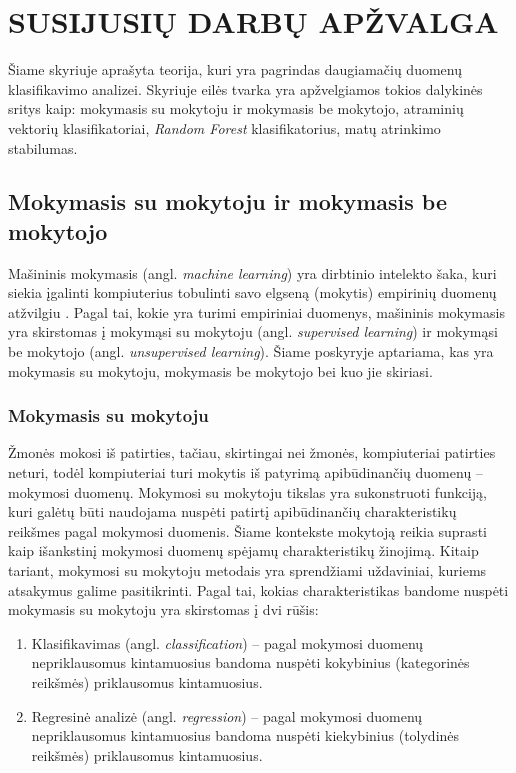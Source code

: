 \section{SUSIJUSIŲ DARBŲ APŽVALGA}
\label{darbu_apzvalga}

Šiame skyriuje aprašyta teorija, kuri yra pagrindas daugiamačių duomenų klasifikavimo analizei. Skyriuje eilės tvarka yra apžvelgiamos tokios dalykinės sritys kaip: mokymasis su mokytoju ir mokymasis be mokytojo, atraminių vektorių klasifikatoriai, \textit{Random Forest} klasifikatorius, matų atrinkimo stabilumas.

\subsection{Mokymasis su mokytoju ir mokymasis be mokytojo}

Mašininis mokymasis (angl. \textit{machine learning}) yra dirbtinio intelekto šaka, kuri siekia įgalinti kompiuterius tobulinti savo elgseną (mokytis) empirinių duomenų atžvilgiu \cite{duda2001pattern}. Pagal tai, kokie yra turimi empiriniai duomenys, mašininis mokymasis yra skirstomas į mokymąsi su mokytoju (angl. \textit{supervised learning}) ir mokymąsi be mokytojo (angl. \textit{unsupervised learning}). Šiame poskyryje aptariama, kas yra mokymasis su mokytoju, mokymasis be mokytojo bei kuo jie skiriasi.

\subsubsection{Mokymasis su mokytoju}

Žmonės mokosi iš patirties, tačiau, skirtingai nei žmonės, kompiuteriai patirties neturi, todėl kompiuteriai turi mokytis iš patyrimą apibūdinančių duomenų -- mokymosi duomenų. Mokymosi su mokytoju tikslas yra sukonstruoti funkciją, kuri galėtų būti naudojama nuspėti patirtį apibūdinančių charakteristikų reikšmes pagal mokymosi duomenis. Šiame kontekste mokytoją reikia suprasti kaip išankstinį mokymosi duomenų spėjamų charakteristikų žinojimą. Kitaip tariant, mokymosi su mokytoju metodais yra sprendžiami uždaviniai, kuriems atsakymus galime pasitikrinti. Pagal tai, kokias charakteristikas bandome nuspėti mokymasis su mokytoju yra skirstomas į dvi rūšis:
\begin{enumerate}
  \item Klasifikavimas (angl. \textit{classification}) -- pagal mokymosi duomenų nepriklausomus kintamuosius bandoma nuspėti kokybinius (kategorinės reikšmės) priklausomus kintamuosius.
  \item Regresinė analizė (angl. \textit{regression}) -- pagal mokymosi duomenų nepriklausomus kintamuosius bandoma nuspėti kiekybinius (tolydinės reikšmės) priklausomus kintamuosius.
\end{enumerate} 

